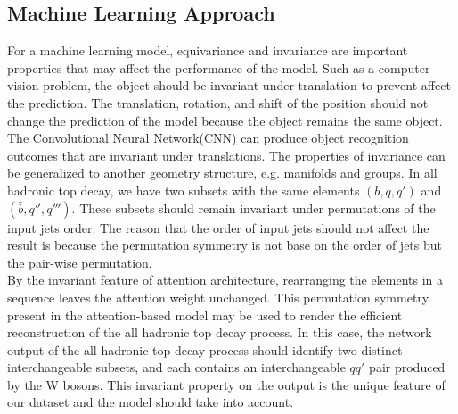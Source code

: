 \subsection{Machine Learning Approach}\label{subsec:ML approach}
For a machine learning model, equivariance and invariance are important properties that may affect the performance of the model. Such as a computer vision problem, the object should be invariant under translation to prevent affect the prediction. The translation, rotation, and shift of the position should not change the prediction of the model because the object remains the same object. The Convolutional Neural Network(CNN) can produce object recognition outcomes that are invariant under translations. The properties of invariance can be generalized to another geometry structure, e.g. manifolds and groups. In all hadronic top decay, we have two subsets with the same elements $(b, q, q')$ and $(\bar{b}, q'', q''')$. These subsets should remain invariant under permutations of the input jets order. The reason that the order of input jets should not affect the result is because the permutation symmetry is not base on the order of jets but the pair-wise permutation.
\\
By the invariant feature of attention architecture, rearranging the elements in a sequence leaves the attention weight unchanged. This permutation symmetry present in the attention-based model may be used to render the efficient reconstruction of the all hadronic top decay process. In this case, the network output of the all hadronic top decay process should identify two distinct interchangeable subsets, and each contains an interchangeable $qq'$ pair produced by the W bosons. This invariant property on the output is the unique feature of our dataset and the model should take into account. 
\\
